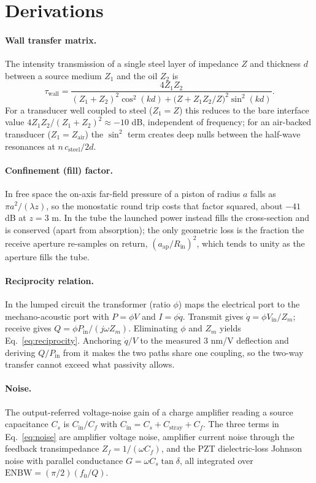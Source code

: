 \section{Derivations}\label{app:derivations}
\paragraph{Wall transfer matrix.} The intensity transmission of a single steel layer of
impedance $Z$ and thickness $d$ between a source medium $Z_1$ and the oil $Z_2$ is
\begin{equation}
\tau_{\mathrm{wall}} = \frac{4 Z_1 Z_2}{(Z_1+Z_2)^2\cos^2(kd) + \big(Z + Z_1 Z_2/Z\big)^2\sin^2(kd)} .
\end{equation}
For a transducer well coupled to steel ($Z_1=Z$) this reduces to the bare interface value
$4 Z_1 Z_2/(Z_1+Z_2)^2 \approx -10$ dB, independent of frequency; for an air-backed transducer
($Z_1=Z_{\mathrm{air}}$) the $\sin^2$ term creates deep nulls between the half-wave resonances
at $n\,c_{\mathrm{steel}}/2d$.

\paragraph{Confinement (fill) factor.} In free space the on-axis far-field pressure of a piston
of radius $a$ falls as $\pi a^2/(\lambda z)$, so the monostatic round trip costs that factor
squared, about $-41$ dB at $z=3$ m. In the tube the launched power instead fills the
cross-section and is conserved (apart from absorption); the only geometric loss is the fraction
the receive aperture re-samples on return, $(a_{\mathrm{ap}}/R_{\mathrm{in}})^2$, which tends to
unity as the aperture fills the tube.

\paragraph{Reciprocity relation.} In the lumped circuit the transformer (ratio $\phi$) maps the
electrical port to the mechano-acoustic port with $P=\phi V$ and $I=\phi\dot q$. Transmit gives
$\dot q = \phi V_{\mathrm{in}}/Z_m$; receive gives $Q = \phi P_{\mathrm{in}}/(j\omega Z_m)$.
Eliminating $\phi$ and $Z_m$ yields Eq.~\eqref{eq:reciprocity}. Anchoring $\dot q/V$ to the
measured 3 nm/V deflection and deriving $Q/P_{\mathrm{in}}$ from it makes the two paths share one
coupling, so the two-way transfer cannot exceed what passivity allows.

\paragraph{Noise.} The output-referred voltage-noise gain of a charge amplifier reading a source
capacitance $C_s$ is $C_{\mathrm{in}}/C_f$ with $C_{\mathrm{in}}=C_s+C_{\mathrm{stray}}+C_f$.
The three terms in Eq.~\eqref{eq:noise} are amplifier voltage noise, amplifier current noise
through the feedback transimpedance $Z_f=1/(\omega C_f)$, and the PZT dielectric-loss Johnson
noise with parallel conductance $G=\omega C_s\tan\delta$, all integrated over
$\mathrm{ENBW}=(\pi/2)(f_0/Q)$.

